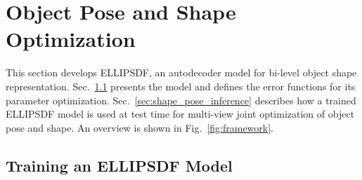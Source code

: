 





\section{Object Pose and Shape Optimization}
\label{sec:reconstruction}

This section develops ELLIPSDF, an autodecoder model for bi-level object shape representation. Sec.~\ref{sec:train_code} presents the model and defines the error functions for its parameter optimization. Sec.~\ref{sec:shape_pose_inference} describes how a trained ELLIPSDF model is used at test time for multi-view joint optimization of object pose and shape. An overview is shown in Fig.~\ref{fig:framework}.






\subsection{Training an ELLIPSDF Model}
\label{sec:train_code}


